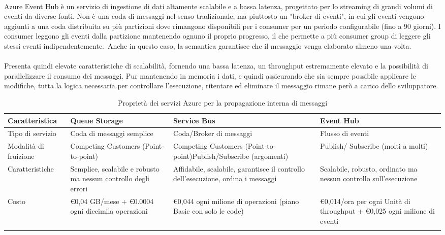 \\
Azure Event Hub è un servizio di ingestione di dati altamente scalabile e a bassa latenza,
progettato per lo streaming di grandi volumi di eventi da diverse fonti.
Non è una coda di messaggi nel senso tradizionale,
ma piuttosto un "broker di eventi",
in cui gli eventi vengono aggiunti a una coda distribuita su più partizioni
dove rimangono disponibili per i consumer per un periodo configurabile (fino a 90 giorni).
I consumer leggono gli eventi dalla partizione mantenendo ognuno il proprio progresso,
il che permette a più consumer group di leggere gli stessi eventi indipendentemente.\
Anche in questo caso, la semantica garantisce che il messaggio venga elaborato almeno una volta.\\
\\
Presenta quindi elevate caratteristiche di scalabilità,
fornendo una bassa latenza, un throughput estremamente elevato
e la possibilità di parallelizzare il consumo dei messaggi.
Pur mantenendo in memoria i dati,
e quindi assicurando che sia sempre possibile applicare le modifiche,
tutta la logica necessaria per controllare l'esecuzione, ritentare ed eliminare il messaggio
rimane però a carico dello sviluppatore.\\
\begin{longtable}{|P{2.9cm}|P{3.9cm}|P{3.9cm}|P{3.9cm}|}
    \hline
    \textbf{Caratteristica} & \textbf{Queue Storage}                                         & \textbf{Service Bus}                                                              & \textbf{Event Hub}                                                      \\
    \hline
    Tipo di servizio        & Coda di messaggi semplice                                      & Coda/Broker di messaggi                                                           & Flusso di eventi                                                        \\
    \hline
    Modalità di fruizione   & Competing Customers (Point-to-point)                           & Competing Customers (Point-to-point)\newline Publish/Subscribe (argomenti)        & Publish/ Subscribe (molti a molti)                                      \\
    \hline
    Caratteristiche         & Semplice, scalabile e robusto ma nessun controllo degli errori & Affidabile, scalabile, garantisce il controllo dell'esecuzione, ordina i messaggi & Scalabile, robusto, ordinato ma nessun controllo sull'esecuzione        \\
    \hline
    Costo                   & €0,04 GB/mese + €0.0004 ogni diecimila operazioni              & €0,044 ogni milione di operazioni (piano Basic con solo le code)                  & €0,014/ora per ogni Unità di throughput + €0,025 ogni milione di eventi \\
    \hline
    \caption{Proprietà dei servizi Azure per la propagazione interna di messaggi }
\end{longtable}

